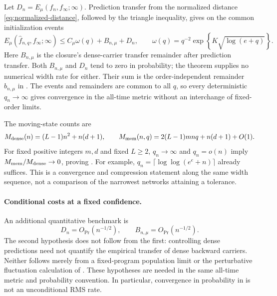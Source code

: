 Let $D_n=E_\mu(f_n,f_\infty;\infty)$.  Prediction transfer from the
normalized distance \eqref{eq:normalized-distance}, followed by the
triangle inequality, gives on the common initialization events
\begin{equation}
 E_\mu(\widehat f_{n,q},f_\infty;\infty)
 \le C_\mu\omega(q)+B_{n,\mu}+D_n,
 \qquad
 \omega(q)=q^{-2}\exp\!\left\{K\sqrt{\log(e+q)}\right\}.
 \label{cmp:triangle}
\end{equation}
Here $B_{n,\mu}$ is the closure's dense-carrier transfer remainder after
prediction transfer.  Both $B_{n,\mu}$ and $D_n$ tend to zero in probability;
the theorem supplies no numerical width rate for either.  Their sum is the
order-independent remainder $b_{n,\mu}$ in .
The events and remainders are common to all $q$, so every deterministic
$q_n\to\infty$ gives convergence in the all-time metric without an
interchange of fixed-order limits.

The moving-state counts are
\begin{equation}
 M_{\rm dense}(n)=(L-1)n^2+n(d+1),\qquad
 M_{\rm mem}(n,q)=2(L-1)mnq+n(d+1)+O(1).
 \label{cmp:moving-counts}
\end{equation}
For fixed positive integers $m,d$ and fixed $L\ge2$,
$q_n\to\infty$ and $q_n=o(n)$ imply
$M_{\rm mem}/M_{\rm dense}\to0$, proving .
For example, $q_n=\lceil\log\log(e^e+n)\rceil$ already suffices.
This is a convergence and compression statement along the same width
sequence, not a comparison of the narrowest networks attaining a tolerance.

\paragraph{Conditional costs at a fixed confidence.}
An additional quantitative benchmark is
\begin{equation}
 D_n=O_{\Pr}(n^{-1/2}),\qquad
 B_{n,\mu}=O_{\Pr}(n^{-1/2}).
 \label{cmp:root-width-hypotheses}
\end{equation}
The second hypothesis does not follow from the first: controlling dense
predictions need not quantify the empirical transfer of dense backward
carriers.  Neither follows merely from a fixed-program population limit or
the perturbative fluctuation calculation of \citet{bordelon2023finite}.
These hypotheses are needed in the same all-time metric and probability
convention.  In particular, convergence in probability in
 is not an unconditional RMS rate.

